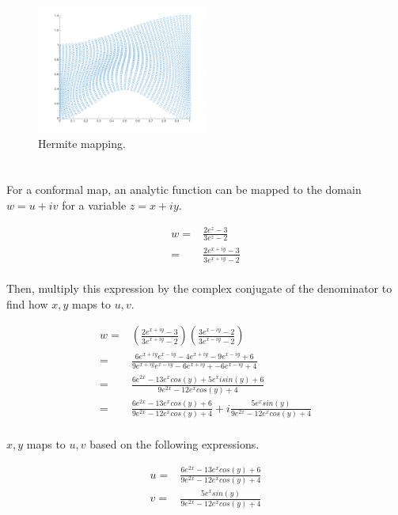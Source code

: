 \documentclass[10pt]{article}
\begin{document}
\begin{figure}[H]
\centering
\includegraphics[width=0.5\textwidth]{hermite_plot.png}
\caption{Hermite mapping.}
\label{fig:hermite}
\end{figure}

\section{}

For a conformal map, an analytic function can be mapped to the domain \(w=u+iv\) for a variable \(z=x+iy\).

\begin{equation}
\begin{aligned}
w=&\frac{2e^z-3}{3e^z-2}\\
=& \frac{2e^{x+iy}-3}{3e^{x+iy}-2}\\
\end{aligned}
\end{equation}

Then, multiply this expression by the complex conjugate of the denominator to find how \(x,y\) maps to \(u,v\). 

\begin{equation}
\begin{aligned}
w=& \left(\frac{2e^{x+iy}-3}{3e^{x+iy}-2}\right)\left(\frac{3e^{x-iy}-2}{3e^{x-iy}-2}\right)\\
=& \frac{6e^{x+iy}e^{x-iy}-4e^{x+iy}-9e^{x-iy}+6}{9e^{x+iy}e^{x-iy}-6e^{x+iy}+-6e^{x-iy}+4}\\
=& \frac{6e^{2x}-13e^xcos(y)+5e^xisin(y)+6}{9e^{2x}-12e^xcos(y)+4}\\
=& \frac{6e^{2x}-13e^xcos(y)+6}{9e^{2x}-12e^xcos(y)+4}+i\frac{5e^xsin(y)}{9e^{2x}-12e^xcos(y)+4}\\
\end{aligned}
\end{equation}

\(x,y\) maps to \(u,v\) based on the following expressions.

\begin{equation}
\label{eq:Trans}
\begin{aligned}
u =& \frac{6e^{2x}-13e^xcos(y)+6}{9e^{2x}-12e^xcos(y)+4}\\
v =& \frac{5e^xsin(y)}{9e^{2x}-12e^xcos(y)+4}\\
\end{aligned}
\end{equation}
\end{document}
